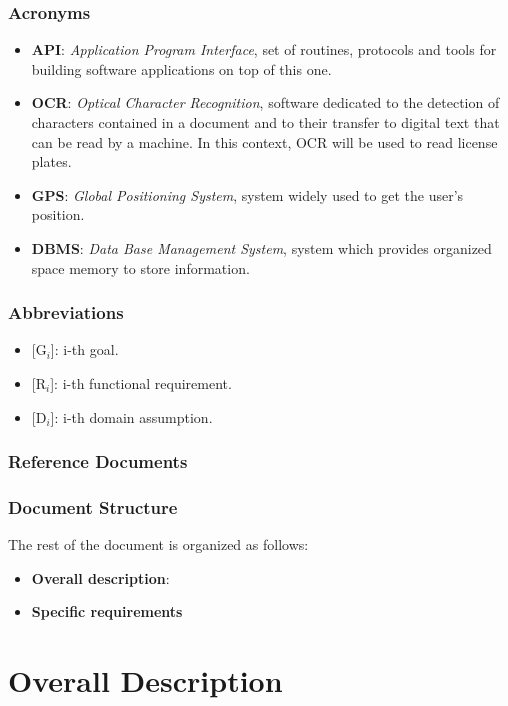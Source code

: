 \documentclass{report}
\begin{document}
\subsection{Acronyms}
\begin{itemize}
\item \textbf{API}: \textit{Application Program Interface}, set of routines, protocols and tools for building software applications on top of this one.
\item \textbf{OCR}: \textit{Optical Character Recognition}, software dedicated to the detection of characters contained in a document and to their transfer to digital text that can be read by a machine. In this context, OCR will be used to read license plates.
\item \textbf{GPS}: \textit{Global Positioning System}, system widely used to get the user's position.
\item \textbf{DBMS}: \textit{Data Base Management System}, system which provides organized space memory to store information.
\end{itemize}
\subsection{Abbreviations}
\begin{itemize}
\item {[G$_{i}$]}: i-th goal.
\item {[R$_{i}$]}: i-th functional requirement.
\item {[D$_{i}$]}: i-th domain assumption.
\end{itemize}
\subsection{Reference Documents}
\subsection{Document Structure}
The rest of the document is organized as follows:
\begin{itemize}
\item{\textbf{Overall description}}: 
\item{\textbf{Specific requirements}}
\end{itemize}

\chapter{Overall Description}
\end{document}
